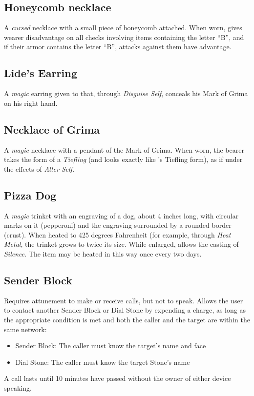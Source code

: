\subsection{Honeycomb necklace}
\label{items:honeycomb}
A \textit{cursed} necklace with a small piece of honeycomb attached. When worn, gives wearer disadvantage on all checks involving items containing the letter ``B'', and if their armor contains the letter ``B'', attacks against them have advantage. 


\subsection{Lide's Earring}
\label{items:lideearring}
A \textit{magic} earring given to  that, through \textit{Disguise Self}, conceals his Mark of Grima on his right hand.

\subsection{Necklace of Grima}
\label{items:grimanecklace}
A \textit{magic} necklace with a pendant of the Mark of Grima. When worn, the bearer takes the form of a \textit{Tiefling} (and looks exactly like 's Tiefling form), as if under the effects of \textit{Alter Self}.

\subsection{Pizza Dog}
\label{items:pizzadog}
A \textit{magic} trinket with an engraving of a dog, about 4 inches long, with circular marks on it (pepperoni) and the 	engraving surrounded by a rounded border (crust). When heated to 425 degrees Fahrenheit (for example, through \textit{Heat Metal}, the trinket grows to twice its size. While enlarged, allows the casting of \textit{Silence}. The item may be heated in this way once every two days.

\subsection{Sender Block}
\label{items:senderblock}
Requires attunement to make or receive calls, but not to speak. Allows the user to contact another Sender Block or Dial Stone by expending a charge, as long as the appropriate condition is met and both the caller and the target are within the same network:
\begin{itemize}
\item     Sender Block: The caller must know the target's name and face
\item     Dial Stone: The caller must know the target Stone's name
\end{itemize}
A call lasts until 10 minutes have passed without the owner of either device speaking.


